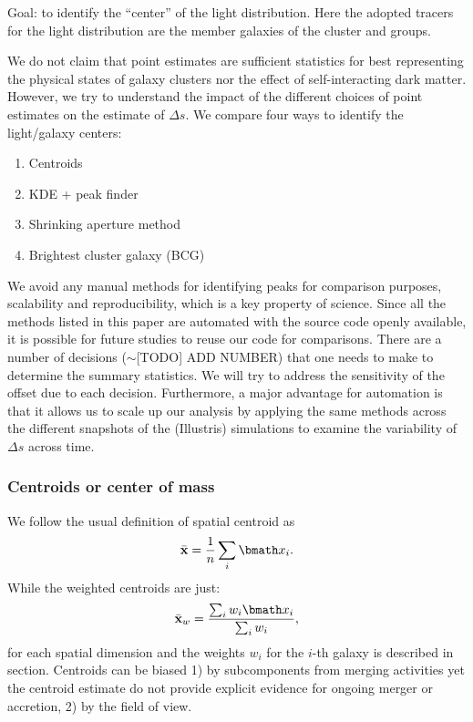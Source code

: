 Goal: to identify the ``center'' of the light distribution. Here the adopted 
tracers for the light distribution are the member galaxies of the cluster 
and groups.

We do not claim that point estimates are sufficient statistics for
best representing the physical states of galaxy clusters nor the effect of
self-interacting dark matter. However, we try to understand the impact of the
different choices of point estimates on the estimate of $\Delta s$. 
We compare four ways to identify the light/galaxy centers:
\begin{enumerate}
\item Centroids
\item KDE + peak finder
\item Shrinking aperture method
\item Brightest cluster galaxy (BCG)

\end{enumerate}
We avoid any manual methods for identifying peaks for
comparison purposes, scalability and reproducibility, 
which is a key property of science. 
Since all the methods listed in this
paper are automated with the source code openly available, 
it is possible for future studies to reuse our code for comparisons. 
There are a number of decisions ($\sim $[TODO] ADD NUMBER) that one needs to make to 
determine the summary statistics. We will try to address the sensitivity of the offset
due to each decision. 
Furthermore, a major advantage for automation is that it allows us  
to scale up our analysis by applying
the same methods across the different snapshots of the (Illustris) simulations to
examine the variability of $\Delta s$ across time. 


\subsubsection{Centroids or center of mass}
\label{Unweighted}
We follow the usual definition of spatial centroid as 
\begin{equation}
	\bar{\bf x} = \frac{1}{n} \sum_i \vec{x}_i. 
\end{equation}
While the weighted centroids are just: 
\begin{equation}
	\bar{\bf x}_w = \frac{\sum_i w_i \vec{x}_i}{\sum_i w_i},
\end{equation}
for each spatial dimension and the weights $w_i$ for the $i$-th galaxy
is described in section.
Centroids can be biased 1) by subcomponents from merging activities yet the
centroid estimate do not provide explicit evidence for ongoing merger or 
accretion, 2) by the field of view.

